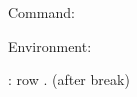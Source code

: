 \documentclass[12pt]{article}
\begin{document}
Command:  

Environment:
\begin{DTLenvmapdata}
 \dtldbname: row \the\dtlrownum.
 (after break)
\end{DTLenvmapdata} 
\end{document}
